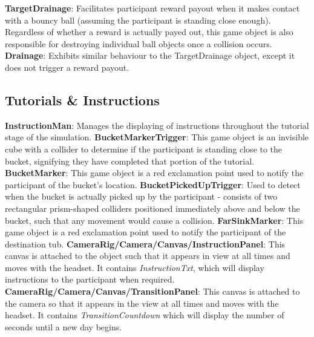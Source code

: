 \documentclass{article}
\begin{document}
\textbf{TargetDrainage}: Facilitates participant reward payout when it makes contact with a bouncy ball (assuming the participant is standing close enough). Regardless of whether a reward is actually payed out, this game object is also responsible for destroying individual ball objects once a collision occurs. \newline \newline
\textbf{Drainage}: Exhibits similar behaviour to the TargetDrainage object, except it does not trigger a reward payout.


\subsection{Tutorials \& Instructions} 
\textbf{InstructionMan}: Manages the displaying of instructions throughout the tutorial stage of the simulation.\newline \newline
\textbf{BucketMarkerTrigger}: This game object is an invisible cube with a collider to determine if the participant is standing close to the bucket, signifying they have completed that portion of the tutorial.\newline \newline
\textbf{BucketMarker}: This game object is a red exclamation point used to notify the participant of the bucket's location.\newline \newline
\textbf{BucketPickedUpTrigger}: Used to detect when the bucket is actually picked up by the participant - consists of two rectangular prism-shaped colliders positioned immediately above and below the bucket, such that any movement would cause a collision.\newline \newline
\textbf{FarSinkMarker}: This game object is a red exclamation point used to notify the participant of the destination tub.\newline \newline
\textbf{CameraRig\slash Camera\slash Canvas\slash InstructionPanel}: This canvas is attached to the  object such that it appears in view at all times and moves with the headset. It contains \textit{InstructionTxt}, which will display instructions to the participant when required. \newline \newline
\textbf{CameraRig/Camera/Canvas/TransitionPanel}: This canvas is attached to the camera so that it appears in the view at all times and moves with the headset. It contains \textit{TransitionCountdown} which will display the number of seconds until a new day begins. 
\end{document}
